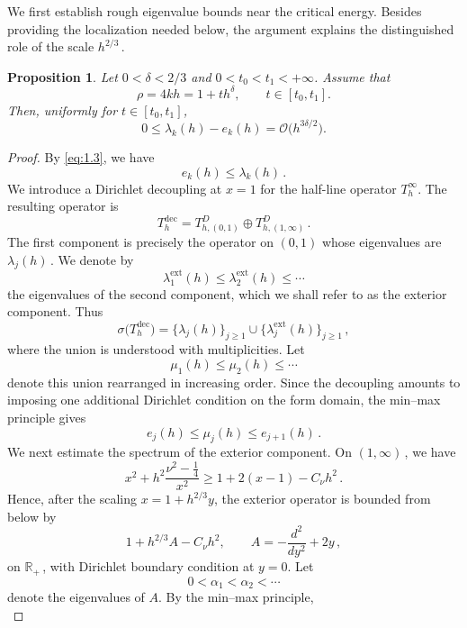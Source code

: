\documentclass[11pt]{amsart}
\numberwithin{equation}{section}
\newtheorem{proposition}[theorem]{Proposition}
\theoremstyle{remark}
\newcommand{\mn}{\medskip\noindent}
\begin{document}
\mn 

	We first establish rough eigenvalue bounds near the critical energy.
	Besides providing the localization needed below, the argument explains
	the distinguished role of the scale $h^{2/3}\,$.
	
\begin{proposition}\label{lem:rough-transition}
Let $0<\delta<2/3$ and $0<t_0<t_1<+\infty$. Assume that
\[
\rho=4kh=1+th^\delta,
\qquad t\in[t_0,t_1].
\]
Then, uniformly for $t\in[t_0,t_1]$,
\[
0\leq \lambda_k(h)-e_k(h)
=\mathcal O\bigl(h^{3\delta/2}\bigr).
\]
\end{proposition}
\begin{proof}
	By \eqref{eq:1.3}, we have
	\begin{equation}\label{eq:rough-lower-bound}
		e_k(h)\leq\lambda_k(h)\,.
	\end{equation}
	We introduce a Dirichlet decoupling at $x=1$ for the half-line
	operator $T_h^\infty$. The resulting operator is
	\[
	T_h^{\mathrm{dec}}
	=
	T_{h,(0,1)}^{D}\oplus T_{h,(1,\infty)}^{D}\,.
	\]
	The first component is precisely the operator on $(0,1)$ whose
	eigenvalues are $\lambda_j(h)\,$. We denote by
	\[
	\lambda_1^{\mathrm{ext}}(h)
	\leq
	\lambda_2^{\mathrm{ext}}(h)
	\leq\cdots
	\]
	the eigenvalues of the second component, which we shall refer to as
	the exterior component. Thus
	\[
	\sigma\bigl(T_h^{\mathrm{dec}}\bigr)
	=
	\{\lambda_j(h)\}_{j\geq1}
	\cup
	\{\lambda_j^{\mathrm{ext}}(h)\}_{j\geq1}\,,
	\]
	where the union is understood with multiplicities. Let
	\[
	\mu_1(h)\leq\mu_2(h)\leq\cdots
	\]
	denote this union rearranged in increasing order. Since the
	decoupling amounts to imposing one additional Dirichlet condition
	on the form domain, the min--max principle gives
	\begin{equation}\label{eq:rough-interlacing}
		e_j(h)\leq\mu_j(h)\leq e_{j+1}(h)\,.
	\end{equation}
	We next estimate the spectrum of the exterior component. On
	$(1,\infty)\,$, we have
	\[
	x^2+h^2\frac{\nu^2-\frac14}{x^2}
	\geq
	1+2(x-1)-C_\nu h^2\,.
	\]
	Hence, after the scaling $x=1+h^{2/3}y$, the exterior operator is
	bounded from below by
	\[
	1+h^{2/3}A-C_\nu h^2,
	\qquad
	A=-\frac{d^2}{dy^2}+2y\,,
	\]
	on $\mathbb R_+\,$, with Dirichlet boundary condition at $y=0$.
	Let
	\[
	0<\alpha_1<\alpha_2<\cdots
	\]
	denote the eigenvalues of $A$. By the min--max principle,
	\begin{equation}\label{eq:rough-exterior-eigenvalue-lower-bound}

\end{equation}
\end{proof}
\end{document}
